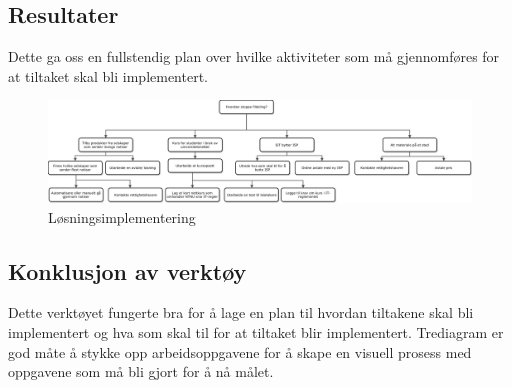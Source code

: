 \subsection{Resultater}
Dette ga oss en fullstendig plan over hvilke aktiviteter som må gjennomføres for at tiltaket skal bli implementert. 

\begin{figure}[H] 
    \centering    
    \includegraphics[scale=0.55, angle=90]{case_1/bilder/Tre-diagram.pdf}
    \caption[Trediagram til tiltak for case 1]{Løsningsimplementering}
    \label{fig:Tre-diagram}
\end{figure}

\subsection{Konklusjon av verktøy}
Dette verktøyet fungerte bra for å lage en plan til hvordan tiltakene skal bli implementert og hva som skal til for at tiltaket blir implementert. Trediagram er god måte å stykke opp arbeidsoppgavene for å skape en visuell prosess med oppgavene som må bli gjort for å nå målet.